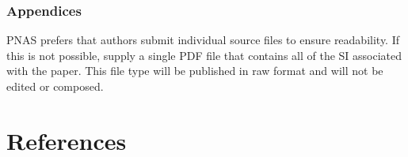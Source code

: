 \documentclass[9pt,twocolumn,twoside]{pnas-new}
\begin{document}
\subsubsection*{Appendices}

PNAS prefers that authors submit individual source files to ensure readability. If this is not possible, supply a single PDF file that contains all of the SI associated with the paper. This file type will be published in raw format and will not be edited or composed.

\showacknow{} %


\section*{References}

\end{document}
